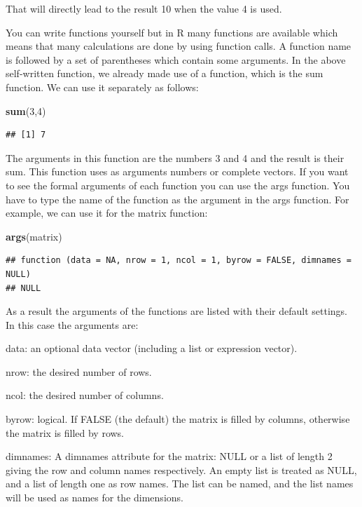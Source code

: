 \documentclass[]{book}
\newenvironment{Shaded}{\begin{snugshade}}{\end{snugshade}}
\newcommand{\KeywordTok}[1]{\textcolor[rgb]{0.13,0.29,0.53}{\textbf{#1}}}
\newcommand{\DecValTok}[1]{\textcolor[rgb]{0.00,0.00,0.81}{#1}}
\newcommand{\NormalTok}[1]{#1}
\theoremstyle{definition}
\theoremstyle{definition}
\theoremstyle{definition}
\theoremstyle{remark}
\begin{document}
That will directly lead to the result 10 when the value 4 is used.

You can write functions yourself but in R many functions are available
which means that many calculations are done by using function calls. A
function name is followed by a set of parentheses which contain some
arguments. In the above self-written function, we already made use of a
function, which is the sum function. We can use it separately as
follows:

\begin{Shaded}
\begin{Highlighting}[]
\KeywordTok{sum}\NormalTok{(}\DecValTok{3}\NormalTok{,}\DecValTok{4}\NormalTok{)}
\end{Highlighting}
\end{Shaded}

\begin{verbatim}
## [1] 7
\end{verbatim}

The arguments in this function are the numbers 3 and 4 and the result is
their sum. This function uses as arguments numbers or complete vectors.
If you want to see the formal arguments of each function you can use the
args function. You have to type the name of the function as the argument
in the args function. For example, we can use it for the matrix
function:

\begin{Shaded}
\begin{Highlighting}[]
\KeywordTok{args}\NormalTok{(matrix)}
\end{Highlighting}
\end{Shaded}

\begin{verbatim}
## function (data = NA, nrow = 1, ncol = 1, byrow = FALSE, dimnames = NULL) 
## NULL
\end{verbatim}

As a result the arguments of the functions are listed with their default
settings. In this case the arguments are:

data: an optional data vector (including a list or expression vector).

nrow: the desired number of rows.

ncol: the desired number of columns.

byrow: logical. If FALSE (the default) the matrix is filled by columns,
otherwise the matrix is filled by rows.

dimnames: A dimnames attribute for the matrix: NULL or a list of length
2 giving the row and column names respectively. An empty list is treated
as NULL, and a list of length one as row names. The list can be named,
and the list names will be used as names for the dimensions.
\end{document}

